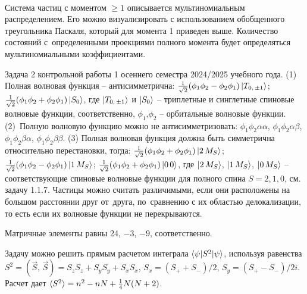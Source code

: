 \hspace{\fill}
\quad\quad
{}
\vspace{-\parskip}
\\
Система частиц с моментом $\geq1$ описывается мультиномиальным распределением. Его можно визуализировать с использованием обобщенного треугольника Паскаля, который для момента 1 приведен выше. Количество состояний с~определенными проекциями полного момента будет определяться мультиномиальными коэффициентами.\par
{} Задача 2 контрольной работы 1 осеннего семестра 2024/2025 учебного года. (1) Полная волновая функция – антисимметрична: $\frac{1}{\sqrt{2}}(\phi_1\phi_2-\phi_2\phi_1)\ket{T_{0,\,\pm1}}$; $\frac{1}{\sqrt{2}}(\phi_1\phi_2+\phi_2\phi_1)\ket{S_{0}}$, где $\ket{T_{0,\,\pm1}}$ и $\ket{S_{0}}$ – триплетные и синглетные спиновые волновые функции, соответственно, $\phi_1\text{,} \phi_2$ – орбитальные волновые функции. (2)~Полную волновую функцию можно не антисимметризовать: $\phi_1\phi_2\alpha\alpha$, $\phi_1\phi_2\alpha\beta$, $\phi_1\phi_2\beta\alpha$, $\phi_1\phi_2\beta\beta$. (3) Полная волновая функция должна быть симметрична относительно перестановки, тогда: $\frac{1}{\sqrt{2}}(\phi_1\phi_2+\phi_2\phi_1)\ket{2\,M_S}$; $\frac{1}{\sqrt{2}}(\phi_1\phi_2-\phi_2\phi_1)\ket{1\,M_S}$; $\frac{1}{\sqrt{2}}(\phi_1\phi_2+\phi_2\phi_1)\ket{0\,0}$, где $\ket{2\, M_S}$, $\ket{1\, M_S}$, $\ket{0\, M_S}$ – соответствующие спиновые волновые функции для полного спина $S=2\text{,}\,1\text{,}\,0$, см. задачу 1.1.7. Частицы можно считать различимыми, если они расположены на большом расстоянии друг от~друга, по~сравнению с их областью делокализации, то есть если их волновые функции не перекрываются.\par
{} Матричные элементы равны 24, $-3$, $-9$, соответственно.\par
{} Задачу можно решить прямым расчетом интеграла $\braket{\psi|{S}^2|\psi}$, используя равенства ${S}^2 = (\vec{S},\,\vec{S})=S_{z}S_{z}+S_{y}S_{y}+S_{x}S_{x}$, $S_x=(S_+ + S_-)/2$, $S_y=(S_+ - S_-)/2i$. Расчет дает $\braket{{S}^2} = n^2 - nN + \frac{1}{4}N(N+2)$.\par
\newpage

